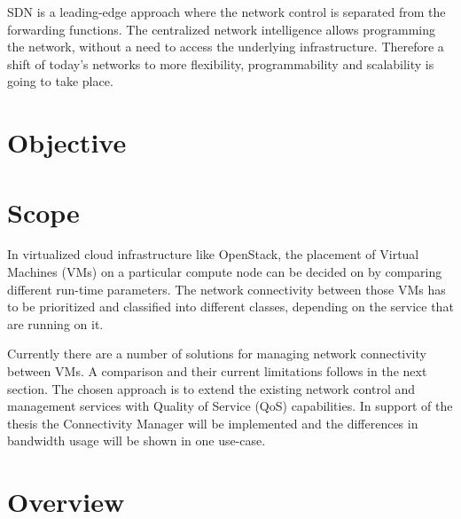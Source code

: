 SDN is a leading-edge approach where the network control is separated from the forwarding functions. The centralized network intelligence allows programming the network, without a need to access the underlying infrastructure. Therefore a shift of today's networks to more flexibility, programmability and scalability is going to take place.

\section{Objective}

\section{Scope}
In virtualized cloud infrastructure like OpenStack, the placement of Virtual Machines (VMs) on a particular compute node can be decided on by comparing different run-time parameters. The network connectivity between those VMs has to be prioritized and classified into different classes, depending on the service that are running on it.

Currently there are a number of solutions for managing network connectivity between VMs. A comparison and their current limitations follows in the next section. The chosen approach is to extend the existing network control and management services with Quality of Service (QoS) capabilities. In support of the thesis the Connectivity Manager will be implemented and the differences in bandwidth usage will be shown in one use-case.
\section{Overview}
